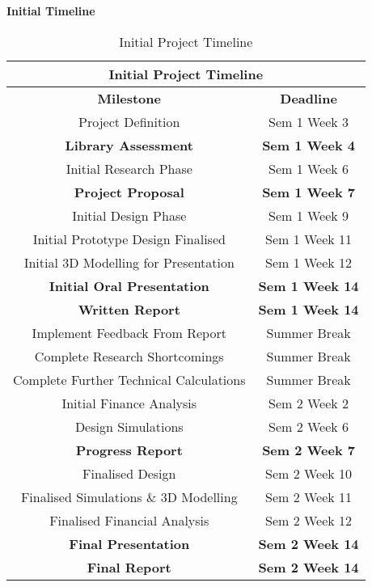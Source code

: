 \newpage
\textbf{Initial Timeline}

\begin{table}[H]
	\centering
	\begin{tabular}{||c c||} 
		\hline
		\multicolumn{2}{|c|}{\textbf{Initial Project Timeline}} \\ [0.5ex] 
		\hline\hline
		\textbf{Milestone} & \textbf{Deadline} \\ 
		\hline\hline
		Project Definition 							& Sem 1 Week 3 \\ 
		\textbf{Library Assessment} 				& \textbf{Sem 1 Week 4} \\
		Initial Research Phase 						& Sem 1 Week 6 \\
		\textbf{Project Proposal} 					& \textbf{Sem 1 Week 7} \\
		Initial Design Phase 						& Sem 1 Week 9 \\
		Initial Prototype Design Finalised 			& Sem 1 Week 11 \\
		Initial 3D Modelling for Presentation 		& Sem 1 Week 12 \\
		\textbf{Initial Oral Presentation} 			& \textbf{Sem 1 Week 14} \\ 
		\textbf{Written Report} 					& \textbf{Sem 1 Week 14} \\ 
		Implement Feedback From Report 				& Summer Break \\
		Complete Research Shortcomings 				& Summer Break \\
		Complete Further Technical Calculations 	& Summer Break \\
		Initial Finance Analysis 					& Sem 2 Week 2 \\
		Design Simulations 							& Sem 2 Week 6 \\
		\textbf{Progress Report} 					& \textbf{Sem 2 Week 7} \\
		Finalised Design 							& Sem 2 Week 10 \\
		Finalised Simulations \& 3D Modelling 		& Sem 2 Week 11 \\
		Finalised Financial Analysis				& Sem 2 Week 12 \\
		\textbf{Final Presentation} 				& \textbf{Sem 2 Week 14} \\
		\textbf{Final Report} 						& \textbf{Sem 2 Week 14} \\ [1ex] 
		\hline
	\end{tabular}
	\caption{Initial Project Timeline}
	\label{table:timeline_original}
\end{table}    

